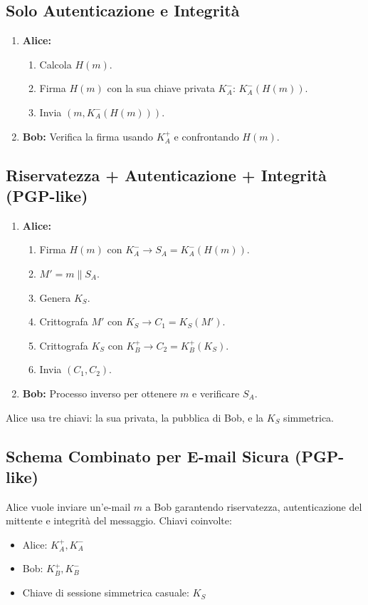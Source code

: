 \subsection{Solo Autenticazione e Integrità}
\begin{enumerate}
    \item \textbf{Alice:}
    \begin{enumerate}
        \item Calcola $H(m)$.
        \item Firma $H(m)$ con la sua chiave privata $K_A^-$: $K_A^-(H(m))$.
        \item Invia $(m, K_A^-(H(m)))$.
    \end{enumerate}
    \item \textbf{Bob:}
    Verifica la firma usando $K_A^+$ e confrontando $H(m)$.
\end{enumerate}

\subsection{Riservatezza + Autenticazione + Integrità (PGP-like)}
\begin{enumerate}
    \item \textbf{Alice:}
    \begin{enumerate}
        \item Firma $H(m)$ con $K_A^- \rightarrow S_A = K_A^-(H(m))$.
        \item $M' = m \| S_A$.
        \item Genera $K_S$.
        \item Crittografa $M'$ con $K_S \rightarrow C_1 = K_S(M')$.
        \item Crittografa $K_S$ con $K_B^+ \rightarrow C_2 = K_B^+(K_S)$.
        \item Invia $(C_1, C_2)$.
    \end{enumerate}
    \item \textbf{Bob:}
    Processo inverso per ottenere $m$ e verificare $S_A$.
\end{enumerate}
Alice usa tre chiavi: la sua privata, la pubblica di Bob, e la $K_S$ simmetrica.

\subsection{Schema Combinato per E-mail Sicura (PGP-like)}
\label{ssec:email_pgp_like}
Alice vuole inviare un'e-mail $m$ a Bob garantendo riservatezza, autenticazione del mittente e integrità del messaggio.
Chiavi coinvolte:
\begin{itemize}
    \item Alice: $K_A^+, K_A^-$
    \item Bob: $K_B^+, K_B^-$
    \item Chiave di sessione simmetrica casuale: $K_S$
\end{itemize}

